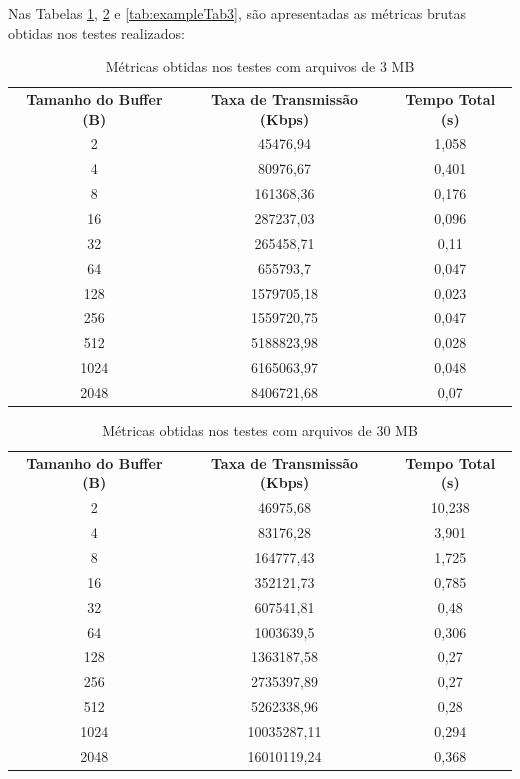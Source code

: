 \documentclass[a4paper, 12pt]{article}
\begin{document}
Nas Tabelas \ref{tab:exampleTab1}, \ref{tab:exampleTab2} e \ref{tab:exampleTab3}, são apresentadas as métricas brutas obtidas nos testes realizados:

\begin{table}[H]
    \centering
    \caption{Métricas obtidas nos testes com arquivos de 3 MB}
    \vspace{0.2cm}
    \label{tab:exampleTab1}
    \begin{tabular}{c|c|c}
        \vspace{0.2cm}
        \textbf{Tamanho do Buffer (B)} & \textbf{Taxa de Transmissão (Kbps)} & \textbf{Tempo Total (s)}\\
        2 & 45476,94 & 1,058\\
        4 & 80976,67 & 0,401\\
        8 & 161368,36 & 0,176\\
        16 & 287237,03 & 0,096\\
        32 & 265458,71 & 0,11\\
        64 & 655793,7 & 0,047\\
        128 & 1579705,18 & 0,023\\
        256 & 1559720,75 & 0,047\\
        512 & 5188823,98 & 0,028\\
        1024 & 6165063,97 & 0,048\\
        2048 & 8406721,68 & 0,07
    \end{tabular}
\end{table}

\begin{table}[H]
    \centering
    \caption{Métricas obtidas nos testes com arquivos de 30 MB}
    \vspace{0.2cm}
    \label{tab:exampleTab2}
    \begin{tabular}{c|c|c}
        \vspace{0.2cm}
        \textbf{Tamanho do Buffer (B)} & \textbf{Taxa de Transmissão (Kbps)} & \textbf{Tempo Total (s)}\\
        2 & 46975,68 & 10,238\\
        4 & 83176,28 & 3,901\\
        8 & 164777,43 & 1,725\\
        16 & 352121,73 & 0,785\\
        32 & 607541,81 & 0,48\\
        64 & 1003639,5 & 0,306\\
        128 & 1363187,58 & 0,27\\
        256 & 2735397,89 & 0,27\\
        512 & 5262338,96 & 0,28\\
        1024 & 10035287,11 & 0,294\\
        2048 & 16010119,24 & 0,368
    \end{tabular}
\end{table}
\end{document}
